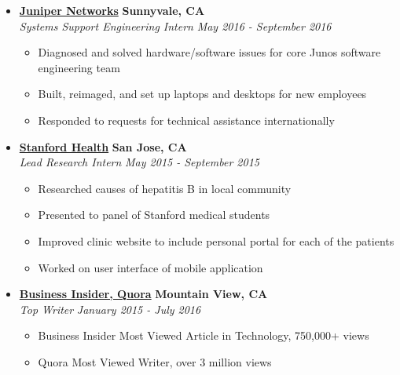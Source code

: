 \documentclass[10pt,letterpaper]{article}
\begin{document}
\begin{itemize}
    \item[]
    {\href{https://www.juniper.net/us/en/}{\textbf{Juniper Networks}} \hfill
      \textbf{Sunnyvale, CA}}
    \\
    {\emph{Systems Support Engineering Intern} \hfill \emph{May 2016 - September 2016}}

    \begin{itemize}[label=\textbullet]
      \itemsep0em
      \item Diagnosed and solved hardware/software issues for core Junos software engineering team
      \item Built, reimaged, and set up laptops and desktops for new employees
      \item Responded to requests for technical assistance internationally
    \end{itemize}

    \item[]
    {\href{https://stanfordhealthcare.org/}{\textbf{Stanford Health}} \hfill
      \textbf{San Jose, CA}}
    \\
    {\emph{Lead Research Intern} \hfill \emph{May 2015 - September 2015}}

    \begin{itemize}[label=\textbullet]
      \itemsep0em
      \item Researched causes of hepatitis B in local community
      \item Presented to panel of Stanford medical students
      \item Improved clinic website to include personal portal for each of the patients
      \item Worked on user interface of mobile application
    \end{itemize}


    \item[]
    {\href{http://www.businessinsider.com/}{\textbf{Business Insider, Quora}} \hfill
      \textbf{Mountain View, CA}}
    \\
    {\emph{Top Writer} \hfill \emph{January 2015 - July 2016}}

    \begin{itemize}[label=\textbullet]
      \itemsep0em
      \item Business Insider Most Viewed Article in Technology, 750,000+ views
      \item Quora Most Viewed Writer, over 3 million views
    \end{itemize}
  \end{itemize}
\end{document}
